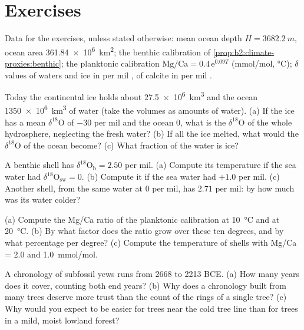 \section*{Exercises}\label{sec:b2:climate-proxies:exercises}

Data for the exercises, unless stated otherwise: mean ocean depth $H = \qty{3682.2}{m}$, ocean
area \qty{361.84e6}{km^2}; the benthic calibration of \cref{prop:b2:climate-proxies:benthic}; the
planktonic calibration $\text{Mg/Ca} = 0.4\,\mathrm{e}^{0.09T}$ (\unit{mmol/mol}, \unit{\celsius});
$\delta$ values of waters and ice in per mil , of calcite in per mil .

\begin{exercise}[$\star$]\label{exo:b2:climate-proxies:1}
Today the continental ice holds about \qty{27.5e6}{km^3} and the ocean \qty{1350e6}{km^3} of
water (take the volumes as amounts of water). (a) If the ice has a mean $\delta^{18}$O of $-30$ per
mil and the ocean 0, what is the $\delta^{18}$O of the whole hydrosphere, neglecting the fresh
water? (b) If all the ice melted, what would the $\delta^{18}$O of the ocean become? (c) What
fraction of the water is ice?
\end{exercise}

\begin{exercise}[$\star$]\label{exo:b2:climate-proxies:2}
A benthic shell has $\delta^{18}\mathrm{O}_{\mathrm{b}} = 2.50$ per mil. (a) Compute its
temperature if the sea water had $\delta^{18}\mathrm{O}_{\mathrm{sw}} = 0$. (b) Compute it if the
sea water had $+1.0$ per mil. (c) Another shell, from the same water at $0$ per mil, has
$2.71$ per mil: by how much was its water colder?
\end{exercise}

\begin{exercise}[$\star$]\label{exo:b2:climate-proxies:3}
(a) Compute the Mg/Ca ratio of the planktonic calibration at \qty{10}{\celsius} and at
\qty{20}{\celsius}. (b) By what factor does the ratio grow over these ten degrees, and by what
percentage per degree? (c) Compute the temperature of shells with Mg/Ca = 2.0 and
\qty{1.0}{mmol/mol}.
\end{exercise}

\begin{exercise}[$\star$]\label{exo:b2:climate-proxies:4}
A chronology of subfossil yews runs from 2668 to 2213 BCE. (a) How many years does it cover,
counting both end years? (b) Why does a chronology built from many trees deserve more trust than
the count of the rings of a single tree? (c) Why would you expect  to be easier for
trees near the cold tree line than for trees in a mild, moist lowland forest?
\end{exercise}

